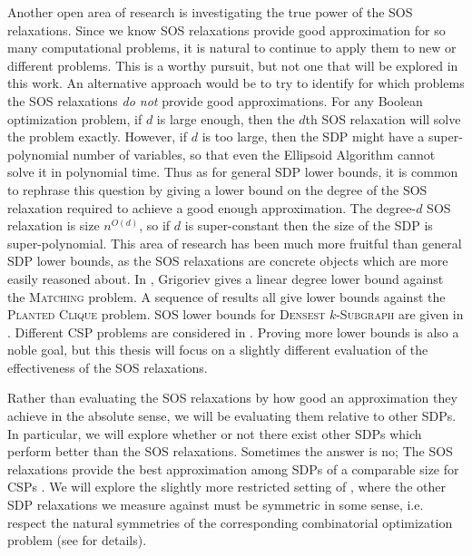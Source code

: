 Another open area of research is investigating the true power of the SOS relaxations.
Since we know SOS relaxations provide good approximation for so many computational problems, it is natural to continue to apply them to new or different problems.
This is a worthy pursuit, but not one that will be explored in this work.
An alternative approach would be to try to identify for which problems the SOS relaxations \emph{do not} provide good approximations.
For any Boolean optimization problem, if $d$ is large enough, then the $d$th SOS relaxation will solve the problem exactly.
However, if $d$ is too large, then the SDP might have a super-polynomial number of variables, so that even the Ellipsoid Algorithm cannot solve it in polynomial time.
Thus as for general SDP lower bounds, it is common to rephrase this question by giving a lower bound on the degree of the SOS relaxation required to achieve a good enough approximation.
The degree-$d$ SOS relaxation is size $n^{O(d)}$, so if $d$ is super-constant then the size of the SDP is super-polynomial.
This area of research has been much more fruitful than general SDP lower bounds, as the SOS relaxations are concrete objects which are more easily reasoned about. 
In \cite{Gri01}, Grigoriev gives a linear degree lower bound against the \textsc{Matching} problem. A sequence of results \cite{MPW15, DM15, RS15, HKP15,BHKKMP16} all give lower bounds against the \textsc{Planted Clique} problem. SOS lower bounds for \textsc{Densest $k$-Subgraph} are given in \cite{BCVGZ12}. Different \textsc{CSP} problems are considered in \cite{Sch08,RS09, GMT09,Tul09,LRS15}.
Proving more lower bounds is also a noble goal, but this thesis will focus on a slightly different evaluation of the effectiveness of the SOS relaxations.


Rather than evaluating the SOS relaxations by how good an approximation they achieve in the absolute sense, we will be evaluating them relative to other SDPs.
In particular, we will explore whether or not there exist other SDPs which perform better than the SOS relaxations.
Sometimes the answer is no; The SOS relaxations provide the best approximation among SDPs of a comparable size for CSPs \cite{LRST14,LRS15}. We will explore the slightly more restricted setting of \cite{LRST14}, where the other SDP relaxations we measure against must be symmetric in some sense, i.e. respect the natural symmetries of the corresponding combinatorial optimization problem (see  for details). 

